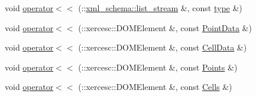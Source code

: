 \begin{DoxyCompactItemize}
\item 
void \hyperlink{vtk-unstructured_8h_a592b2e850332ad8580bb7fbdbdf3405b}{operator$<$$<$} (\+::\hyperlink{namespacexml__schema_ab6c818ac91e70a25620375e0d000be83}{xml\+\_\+schema\+::list\+\_\+stream} \&, const \hyperlink{classtype}{type} \&)
\item 
void \hyperlink{vtk-unstructured_8h_adcc12b50e7eec96e51069960ff490aec}{operator$<$$<$} (\+::xercesc\+::\+D\+O\+M\+Element \&, const \hyperlink{classPointData}{Point\+Data} \&)
\item 
void \hyperlink{vtk-unstructured_8h_ad7d5540bd93e9ed92be18cb521501e0a}{operator$<$$<$} (\+::xercesc\+::\+D\+O\+M\+Element \&, const \hyperlink{classCellData}{Cell\+Data} \&)
\item 
void \hyperlink{vtk-unstructured_8h_ad157bfbf3a7da32268c50c8133d349f7}{operator$<$$<$} (\+::xercesc\+::\+D\+O\+M\+Element \&, const \hyperlink{classPoints}{Points} \&)
\item 
void \hyperlink{vtk-unstructured_8h_a71c62a435e60069931c8d51f1eaed6db}{operator$<$$<$} (\+::xercesc\+::\+D\+O\+M\+Element \&, const \hyperlink{classCells}{Cells} \&)
\end{DoxyCompactItemize}
